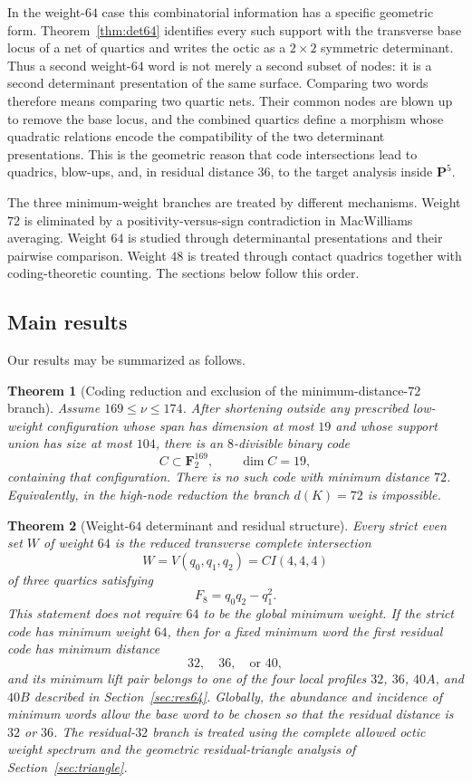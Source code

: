 \documentclass[11pt,reqno]{amsart}
\newtheorem{theorem}{Theorem}[section]
\theoremstyle{remark}
\newcommand{\F}{\mathbf F}
\newcommand{\PP}{\mathbf P}
\begin{document}
In the weight-$64$ case this combinatorial information has a specific geometric form.  Theorem~\ref{thm:det64} identifies every such support with the transverse base locus of a net of quartics and writes the octic as a $2\times2$ symmetric determinant.  Thus a second weight-$64$ word is not merely a second subset of nodes: it is a second determinant presentation of the same surface.  Comparing two words therefore means comparing two quartic nets.  Their common nodes are blown up to remove the base locus, and the combined quartics define a morphism whose quadratic relations encode the compatibility of the two determinant presentations.  This is the geometric reason that code intersections lead to quadrics, blow-ups, and, in residual distance $36$, to the target analysis inside $\PP^5$.

The three minimum-weight branches are treated by different mechanisms.  Weight $72$ is eliminated by a positivity-versus-sign contradiction in MacWilliams averaging.  Weight $64$ is studied through determinantal presentations and their pairwise comparison.  Weight $48$ is treated through contact quadrics together with coding-theoretic counting.  The sections below follow this order.

\subsection{Main results}
Our results may be summarized as follows.

\begin{theorem}[Coding reduction and exclusion of the minimum-distance-$72$ branch]\label{thm:intro72}
Assume $169\le\nu\le174$.  After shortening outside any prescribed low-weight configuration whose span has dimension at most $19$ and whose support union has size at most $104$, there is an $8$-divisible binary code
\[
C\subset\F_2^{169},\qquad \dim C=19,
\]
containing that configuration.  There is no such code with minimum distance $72$.  Equivalently, in the high-node reduction the branch $d(K)=72$ is impossible.
\end{theorem}

\begin{theorem}[Weight-$64$ determinant and residual structure]\label{thm:intro64}
Every strict even set $W$ of weight $64$ is the reduced transverse complete intersection
\[
W=V(q_0,q_1,q_2)=CI(4,4,4)
\]
of three quartics satisfying
\[
F_8=q_0q_2-q_1^2.
\]
This statement does not require $64$ to be the global minimum weight.  If the strict code has minimum weight $64$, then for a fixed minimum word the first residual code has minimum distance
\[
32,\quad36,\quad\text{or }40,
\]
and its minimum lift pair belongs to one of the four local profiles $32$, $36$, $40A$, and $40B$ described in Section~\ref{sec:res64}.  Globally, the abundance and incidence of minimum words allow the base word to be chosen so that the residual distance is $32$ or $36$.  The residual-$32$ branch is treated using the complete allowed octic weight spectrum and the geometric residual-triangle analysis of Section~\ref{sec:triangle}.
\end{theorem}
\end{document}
